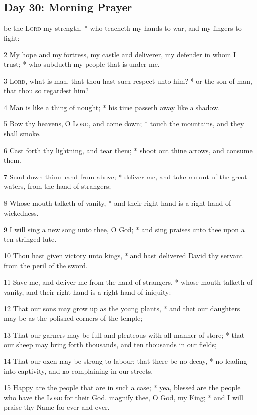 \subsection{Day 30: Morning Prayer}
 be the {\textsc{Lord}} my strength, * who teacheth my hands to war, and my fingers to fight:\par
2 My hope and my fortress, my castle and deliverer, my defender in whom I trust; * who subdueth my people that is under me.\par
3 {\textsc{Lord}}, what is man, that thou hast such respect unto him? * or the son of man, that thou so regardest him?\par
4 Man is like a thing of nought; * his time passeth away like a shadow.\par
5 Bow thy heavens, O {\textsc{Lord}}, and come down; * touch the mountains, and they shall smoke.\par
6 Cast forth thy lightning, and tear them; * shoot out thine arrows, and consume them.\par
7 Send down thine hand from above; * deliver me, and take me out of the great waters, from the hand of strangers;\par
8 Whose mouth talketh of vanity, * and their right hand is a right hand of wickedness.\par
9 I will sing a new song unto thee, O God; * and sing praises unto thee upon a ten-stringed lute.\par
10 Thou hast given victory unto kings, * and hast delivered David thy servant from the peril of the sword.\par
11 Save me, and deliver me from the hand of strangers, * whose mouth talketh of vanity, and their right hand is a right hand of iniquity:\par
12 That our sons may grow up as the young plants, * and that our daughters may be as the polished corners of the temple;\par
13 That our garners may be full and plenteous with all manner of store; * that our sheep may bring forth thousands, and ten thousands in our fields;\par
14 That our oxen may be strong to labour; that there be no decay, * no leading into captivity, and no complaining in our streets.\par
15 Happy are the people that are in such a case; * yea, blessed are the people who have the {\textsc{Lord}} for their God.
 magnify thee, O God, my King; * and I will praise thy Name for ever and ever.\par
